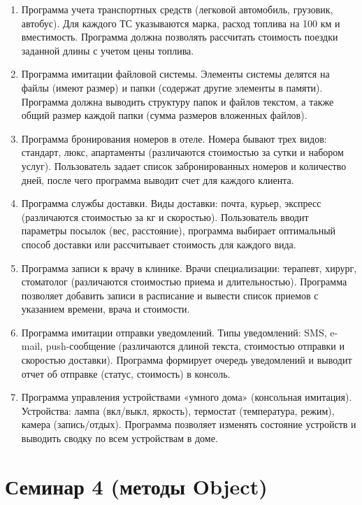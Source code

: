 \documentclass[12pt]{article}
\begin{document}
\begin{enumerate}
\item Программа учета транспортных средств (легковой автомобиль, грузовик, автобус). Для каждого ТС указываются марка, 
расход топлива на 100 км и вместимость. Программа должна позволять рассчитать стоимость поездки заданной длины 
с учетом цены топлива.

\item Программа имитации файловой системы. Элементы системы делятся на файлы (имеют размер) и папки (содержат другие 
элементы в памяти). Программа должна выводить структуру папок и файлов текстом, а также общий размер каждой папки (сумма размеров 
вложенных файлов).

\item Программа бронирования номеров в отеле. Номера бывают трех видов: стандарт, люкс, апартаменты (различаются 
стоимостью за сутки и набором услуг). Пользователь задает список забронированных номеров и количество дней, 
после чего программа выводит счет для каждого клиента.

\item Программа службы доставки. Виды доставки: почта, курьер, экспресс (различаются стоимостью за кг и скоростью). 
Пользователь вводит параметры посылок (вес, расстояние), программа выбирает оптимальный способ доставки или 
рассчитывает стоимость для каждого вида.

\item Программа записи к врачу в клинике. Врачи специализации: терапевт, хирург, стоматолог (различаются стоимостью 
приема и длительностью). Программа позволяет добавить записи в расписание и вывести список приемов с указанием 
времени, врача и стоимости.

\item Программа имитации отправки уведомлений. Типы уведомлений: SMS, e-mail, push-сообщение (различаются длиной текста, 
стоимостью отправки и скоростью доставки). Программа формирует очередь уведомлений и выводит отчет об отправке 
(статус, стоимость) в консоль.

\item Программа управления устройствами «умного дома» (консольная имитация). Устройства: лампа (вкл/выкл, яркость), термостат (температура, 
режим), камера (запись/отдых). Программа позволяет изменять состояние устройств и выводить сводку по всем 
устройствам в доме.
\end{enumerate}

\section{Семинар 4 (методы Object)}
\end{document}
